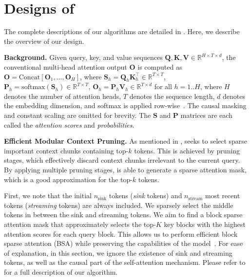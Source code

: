\section{Designs of \ours}
\label{methodology}






The complete descriptions of our algorithms are detailed in . Here, we describe the overview of our design.

\textbf{Background.} 
Given query, key, and value sequences $\bm{Q}, \bm{K}, \bm{V} \in \mathbb{R}^{H\times T\times d}$, the conventional multi-head attention output $\bm{O}$ is computed as
$\bm{O} = \text{Concat}[\bm{O}_1, \dots, \bm{O}_H]$, where
$\bm{S}_h = \bm{Q}_h\bm{K}_h^\top \in \mathbb{R}^{T\times T}$,
$\bm{P}_h = \mathrm{softmax}(\bm{S}_h) \in \mathbb{R}^{T\times T}$,
$\bm{O}_h = \bm{P}_h\bm{V}_h \in \mathbb{R}^{T\times d}$ for all $h = 1..H$,
where $H$ denotes the number of attention heads, $T$ denotes the sequence length, $d$ denotes the embedding dimension, and softmax is applied row-wise~\cite{vaswani_attention_2023}. The causal masking and constant scaling are omitted for brevity.
The $\bm{S}$ and $\bm{P}$ matrices are each called the \textit{attention scores} and \textit{probabilities}.

\textbf{Efficient Modular Context Pruning.} 
As mentioned in , \ours seeks to select sparse important context chunks containing top-$k$ tokens. This is achieved by pruning stages, which effectively discard context chunks irrelevant to the current query. By applying multiple pruning stages, \ours is able to generate a sparse attention mask, which is a good approximation for the top-$k$ tokens.

First, we note that the initial $n_\text{sink}$ tokens (\textit{sink} tokens) and $n_\text{stream}$ most recent tokens (\textit{streaming} tokens) are always included. We sparsely select the middle tokens in between the sink and streaming tokens. We aim to find a block sparse attention mask that approximately selects the top-$K$ key blocks with the highest attention scores for each query block. This allows us to perform efficient block sparse attention (BSA) while preserving the capabilities of the model~\citep{lee_training-free_2024}. For ease of explanation, in this section, we ignore the existence of sink and streaming tokens, as well as the causal part of the self-attention mechanism. Please refer to  for a full description of our algorithm.

